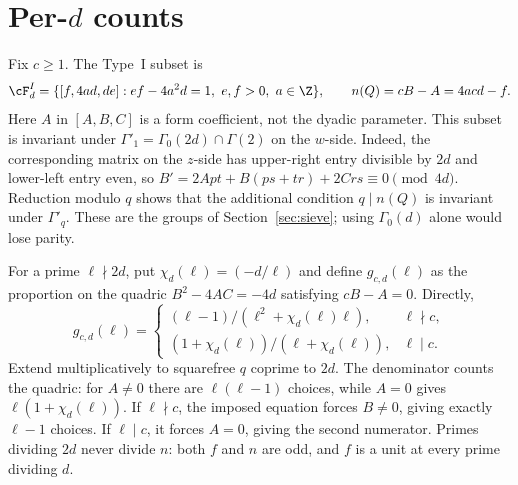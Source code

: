 \section{Per-\texorpdfstring{$d$}{d} counts}\label{sec:perd}
Fix \(c\ge1\). The Type~I subset is
\[
 \cF_d^I=\{[f,4ad,de]:ef-4a^2d=1,\ e,f>0,\ a\in\Z\},
 \qquad n(Q)=cB-A=4acd-f.
\]
Here \(A\) in \([A,B,C]\) is a form coefficient, not the dyadic parameter.
This subset is invariant under \(\Gamma'_1=\Gamma_0(2d)\cap\Gamma(2)\)
on the \(w\)-side. Indeed, the corresponding matrix on the \(z\)-side
has upper-right entry divisible by \(2d\) and lower-left entry even, so
\(B'=2Apt+B(ps+tr)+2Crs\equiv0\pmod{4d}\).
Reduction modulo \(q\) shows that the additional condition \(q\mid n(Q)\)
is invariant under \(\Gamma'_q\). These are the groups of
Section~\ref{sec:sieve}; using \(\Gamma_0(d)\) alone would lose parity.

For a prime \(\ell\nmid2d\), put \(\chi_d(\ell)=(-d/\ell)\) and define
\(g_{c,d}(\ell)\) as the proportion on the quadric
\(B^2-4AC=-4d\) satisfying \(cB-A=0\). Directly,
\begin{equation}\label{B:eq:density}
 g_{c,d}(\ell)=
 \begin{cases}
 (\ell-1)/(\ell^2+\chi_d(\ell)\ell),&\ell\nmid c,\\
 (1+\chi_d(\ell))/(\ell+\chi_d(\ell)),&\ell\mid c.
 \end{cases}
\end{equation}
Extend multiplicatively to squarefree \(q\) coprime to \(2d\).
The denominator counts the quadric: for \(A\ne0\) there are
\(\ell(\ell-1)\) choices, while \(A=0\) gives
\(\ell(1+\chi_d(\ell))\). If \(\ell\nmid c\), the imposed equation
forces \(B\ne0\), giving exactly \(\ell-1\) choices. If \(\ell\mid c\),
it forces \(A=0\), giving the second numerator. Primes dividing \(2d\)
never divide \(n\): both \(f\) and \(n\) are odd, and \(f\) is a unit
at every prime dividing \(d\).

